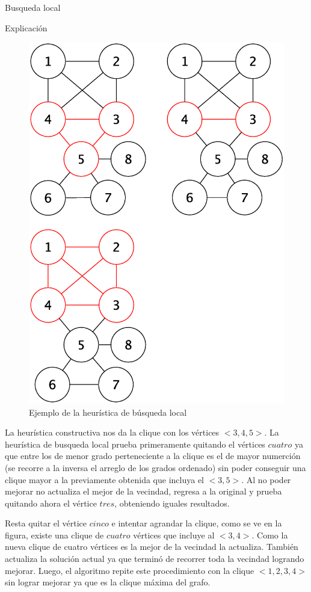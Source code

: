 \begin{section}{Busqueda local}
\begin{subsection}{Explicación}
\begin{figure}[H]
			\includegraphics[scale=0.5]{busqueda_local/seguimiento_cont.eps}
			    \caption{Ejemplo de la heurística de búsqueda local}
			    \label{fig:seguimiento_busqueda_local}
			\end{figure}

			La heurística constructiva nos da la clique con los vértices $<3,4,5>$. La heurística de busqueda local prueba primeramente quitando el vértices $cuatro$ ya que entre los de menor grado perteneciente a la clique es el de mayor numerción (se recorre a la inversa el arreglo de los grados ordenado) sin poder conseguir una clique mayor a la previamente obtenida que incluya el $<3,5>$. Al no poder mejorar no actualiza el mejor de la vecindad, regresa a la original y prueba quitando ahora el vértice $tres$, obteniendo iguales resultados.

			Resta quitar el vértice $cinco$ e intentar agrandar la clique, como se ve en la figura, existe una clique de $cuatro$ vértices que incluye al $<3,4>$. Como la nueva clique de cuatro vértices es la mejor de la vecindad la actualiza. También actualiza la solución actual ya que terminó de recorrer toda la vecindad logrando mejorar. Luego, el algoritmo repite este procedimiento con la clique $<1,2,3,4>$  sin lograr mejorar ya que es la clique máxima del grafo.


\end{subsection}
\end{section}
